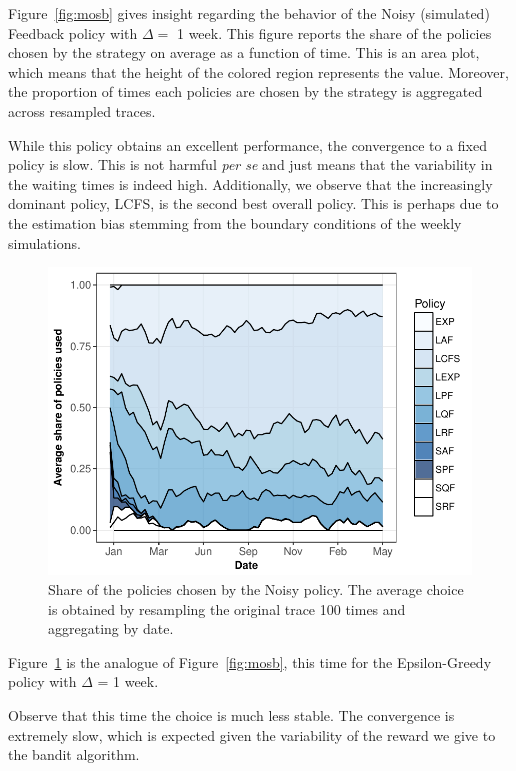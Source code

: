 \documentclass[sigconf,anonymous]{acmart}
\begin{document}
Figure~\ref{fig:mosb} gives insight regarding the behavior of the Noisy
(simulated) Feedback policy with $\Delta=$ 1 week. This figure reports the
share of the policies chosen by the strategy on average as a function of time.
This is an area plot, which means that the height of the colored region
represents the value. Moreover, the proportion of times each policies are
chosen by the strategy is aggregated across resampled traces.

While this policy obtains an excellent performance, the convergence to a fixed
policy is slow.  This is not harmful \textit{per se} and just means that the
variability in the waiting times is indeed high. Additionally, we observe that
the increasingly dominant policy, LCFS, is the second best overall policy. This
is perhaps due to the estimation bias stemming from the boundary conditions of
the weekly simulations.

\begin{figure}[]
  \centering
  \includegraphics[scale=0.6]{figures/mosaic-ANL-Intr.pdf}

  \caption{Share of the policies chosen by the Noisy policy. The average choice
  is obtained by resampling the original trace 100 times and aggregating by
  date.}

  \label{fig:mosn}
\end{figure}

Figure~\ref{fig:mosn} is the analogue of Figure~\ref{fig:mosb}, this time for
the Epsilon-Greedy policy with $\Delta$ = 1 week.

Observe that this time the choice is much less stable. The convergence is
extremely slow, which is expected given the variability of the reward we give
to the bandit algorithm.
\end{document}
